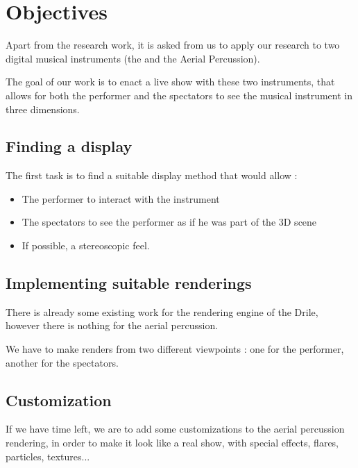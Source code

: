 \section{Objectives}
Apart from the research work, it is asked from us to apply our research to two digital musical instruments (the  and the Aerial Percussion).

The goal of our work is to enact a live show with these two instruments, that allows for both the performer and the spectators to see the musical instrument in three dimensions.

\subsection{Finding a display}
The first task is to find a suitable display method that would allow : 
\begin{itemize}
\item The performer to interact with the instrument
\item The spectators to see the performer as if he was part of the 3D scene
\item If possible, a stereoscopic feel.
\end{itemize}

\subsection{Implementing suitable renderings}
There is already some existing work for the rendering engine of the Drile, however there is nothing for the aerial percussion.

We have to make renders from two different viewpoints : one for the performer, another for the spectators.

\subsection{Customization}
If we have time left, we are to add some customizations to the aerial percussion rendering, in order to make it look like a real show, with special effects, flares, particles, textures...